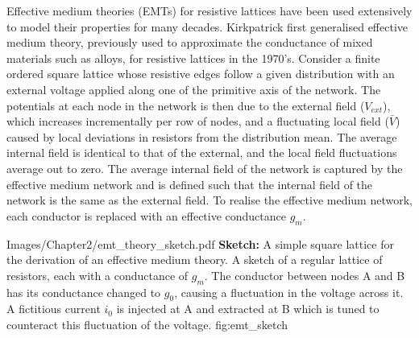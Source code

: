 Effective medium theories (EMTs) for resistive lattices have been used extensively to model their properties for many decades. Kirkpatrick first generalised effective medium theory, previously used to approximate the conductance of mixed materials such as alloys, for resistive lattices in the 1970's\cite{kirkpatrick1973}. Consider a finite ordered square lattice whose resistive edges follow a given distribution with an external voltage applied along one of the primitive axis of the network. The potentials at each node in the network is then due to the external field ($V_{ext}$), which increases incrementally per row of nodes, and a fluctuating local field ($\bar{V}$) caused by local deviations in resistors from the distribution mean. The average internal field is identical to that of the external, and the local field fluctuations average out to zero. The average internal field of the network is captured by the effective medium network and is defined such that the internal field of the network is the same as the external field. To realise the effective medium network, each conductor is replaced with an effective conductance $g_m$.

{Images/Chapter2/emt_theory_sketch.pdf}
{\textbf{Sketch:} A simple square lattice for the derivation of an effective medium theory.}
{A sketch of a regular lattice of resistors, each with a conductance of $g_m$. The conductor between nodes A and B has its conductance changed to $g_0$, causing a fluctuation in the voltage across it. A fictitious current $i_0$ is injected at A and extracted at B which is tuned to counteract this fluctuation of the voltage. }
{fig:emt_sketch}

